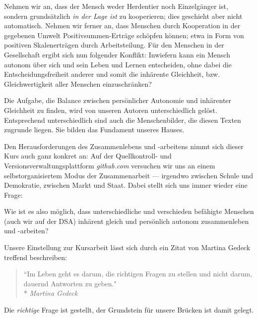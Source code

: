 Nehmen wir an, dass der Mensch weder Herdentier noch Einzelgänger ist, sondern grundsätzlich \emph{in der Lage ist} zu kooperieren; dies geschieht aber nicht automatisch.
Nehmen wir ferner an, dass Menschen durch Kooperation in der gegebenen Umwelt Positivsummen-Erträge schöpfen können; etwa in Form von positiven Skalenerträgen durch Arbeitsteilung.
Für den Menschen in der Gesellschaft ergibt sich nun folgender Konflikt:
Inwiefern kann ein Mensch autonom über sich und sein Leben und Lernen entscheiden, ohne dabei die Entscheidungsfreiheit anderer und somit die inhärente Gleichheit, bzw. Gleichwertigkeit aller Menschen einzuschränken?

Die Aufgabe, die Balance zwischen persönlicher Autonomie und inhärenter Gleichheit zu finden, wird von unseren Autoren unterschiedlich gelöst.
Entsprechend unterschiedlich sind auch die Menschenbilder, die diesen Texten zugrunde liegen.
Sie bilden das Fundament unseres Hauses.

Den Herausforderungen des Zusammenlebens und -arbeitens nimmt sich dieser Kurs auch ganz konkret an:
Auf der Quellkontroll- und Versionsverwaltungsplattform \emph{github.com} versuchen wir uns an einem selbstorganisiertem Modus der Zusammenarbeit --- irgendwo zwischen Schule und Demokratie, zwischen Markt und Staat.
Dabei stellt sich uns immer wieder eine Frage:

Wie ist es also möglich, dass unterschiedliche und verschieden befähigte Menschen (auch wir auf der DSA) inhärent gleich und persönlich autonom zusammenleben und -arbeiten?

Unsere Einstellung zur Kursarbeit lässt sich durch ein Zitat von Martina Gedeck treffend beschreiben:

\begin{quote}
	``Im Leben geht es darum, die richtigen Fragen zu stellen und nicht darum, dauernd Antworten zu geben."\\*
	\emph{Martina Gedeck}
\end{quote}

Die \emph{richtige} Frage ist gestellt, der Grundstein für unsere Brücken ist damit gelegt.